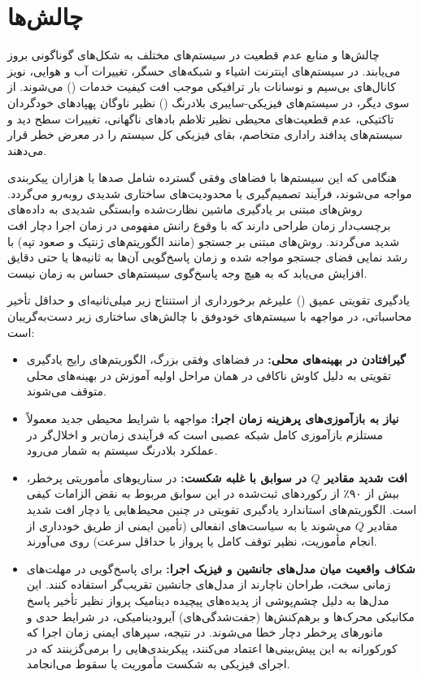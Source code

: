 \documentclass[oneside,openany,phd]{TMU-Thesis}
\begin{document}
\section{چالش‌ها}

چالش‌ها و منابع عدم قطعیت در سیستم‌های مختلف به شکل‌های گوناگونی بروز می‌یابند. در سیستم‌های اینترنت اشیاء و شبکه‌های حسگر، تغییرات آب و هوایی، نویز کانال‌های بی‌سیم و نوسانات بار ترافیکی موجب افت کیفیت خدمات () می‌شوند. از سوی دیگر، در سیستم‌های فیزیکی-سایبری بلادرنگ () نظیر ناوگان پهپادهای خودگردان تاکتیکی، عدم قطعیت‌های محیطی نظیر تلاطم بادهای ناگهانی، تغییرات سطح دید و سیستم‌های پدافند راداری متخاصم، بقای فیزیکی کل سیستم را در معرض خطر قرار می‌دهند.

هنگامی که این سیستم‌ها با فضاهای وفقی گسترده شامل صدها یا هزاران پیکربندی مواجه می‌شوند، فرآیند تصمیم‌گیری با محدودیت‌های ساختاری شدیدی روبه‌رو می‌گردد. روش‌های مبتنی بر یادگیری ماشین نظارت‌شده وابستگی شدیدی به داده‌های برچسب‌دار زمان طراحی دارند که با وقوع رانش مفهومی در زمان اجرا دچار افت شدید می‌گردند. روش‌های مبتنی بر جستجو (مانند الگوریتم‌های ژنتیک و صعود تپه) با رشد نمایی فضای جستجو مواجه شده و زمان پاسخ‌گویی آن‌ها به ثانیه‌ها یا حتی دقایق افزایش می‌یابد که به هیچ وجه پاسخ‌گوی سیستم‌های حساس به زمان نیست.

یادگیری تقویتی عمیق () علیرغم برخورداری از استنتاج زیر میلی‌ثانیه‌ای و حداقل تأخیر محاسباتی، در مواجهه با سیستم‌های خودوفق با چالش‌های ساختاری زیر دست‌به‌گریبان است:
\begin{itemize}
    \item \textbf{گیرافتادن در بهینه‌های محلی:} در فضاهای وفقی بزرگ، الگوریتم‌های رایج یادگیری تقویتی به دلیل کاوش ناکافی در همان مراحل اولیه آموزش در بهینه‌های محلی متوقف می‌شوند.
    \item \textbf{نیاز به بازآموزی‌های پرهزینه زمان اجرا:} مواجهه با شرایط محیطی جدید معمولاً مستلزم بازآموزی کامل شبکه عصبی است که فرآیندی زمان‌بر و اخلال‌گر در عملکرد بلادرنگ سیستم به شمار می‌رود.
    \item \textbf{افت شدید مقادیر $Q$ در سوابق با غلبه شکست:} در سناریوهای مأموریتی پرخطر، بیش از ۹۰٪ از رکوردهای ثبت‌شده در این سوابق مربوط به نقض الزامات کیفی است. الگوریتم‌های استاندارد یادگیری تقویتی در چنین محیط‌هایی یا دچار افت شدید مقادیر $Q$ می‌شوند یا به سیاست‌های انفعالی (تأمین ایمنی از طریق خودداری از انجام مأموریت، نظیر توقف کامل یا پرواز با حداقل سرعت) روی می‌آورند.
    \item \textbf{شکاف واقعیت میان مدل‌های جانشین و فیزیک اجرا:} برای پاسخ‌گویی در مهلت‌های زمانی سخت، طراحان ناچارند از مدل‌های جانشین تقریب‌گر استفاده کنند. این مدل‌ها به دلیل چشم‌پوشی از پدیده‌های پیچیده دینامیک پرواز نظیر تأخیر پاسخ مکانیکی محرک‌ها و برهم‌کنش‌ها (جفت‌شدگی‌های) آیرودینامیکی، در شرایط حدی و مانورهای پرخطر دچار خطا می‌شوند. در نتیجه، سپرهای ایمنی زمان اجرا که کورکورانه به این پیش‌بینی‌ها اعتماد می‌کنند، پیکربندی‌هایی را برمی‌گزینند که در اجرای فیزیکی به شکست مأموریت یا سقوط می‌انجامد.
\end{itemize}
\end{document}
